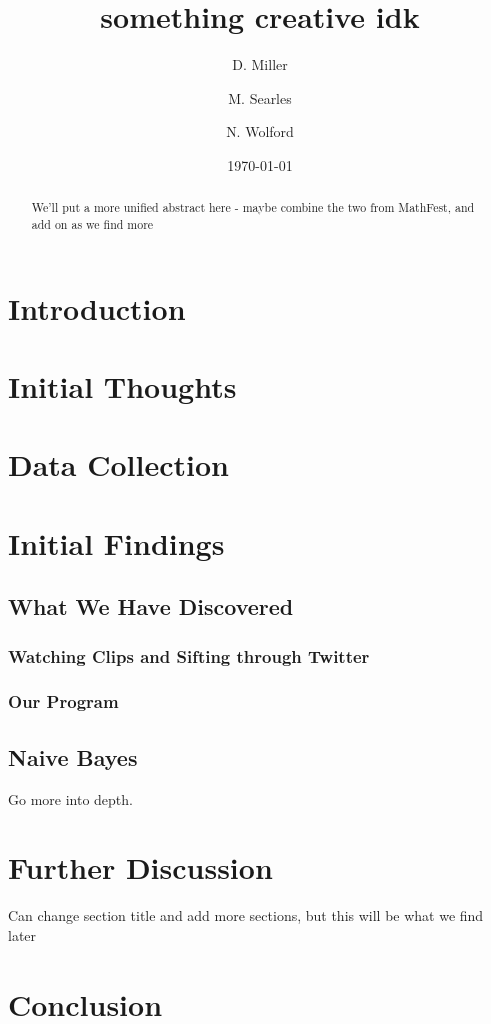 \documentclass[titlepage]{article}
\begin{document}
\title{something creative idk}
\author{D. Miller \and M. Searles \and N. Wolford} %
\date{\today}
\maketitle

\begin{abstract}
We'll put a more unified abstract here - maybe combine the two from MathFest, and add on as we find more
\end{abstract}

\section{Introduction}


\section{Initial Thoughts}


\section{Data Collection}


\section{Initial Findings}

\subsection{What We Have Discovered}

\subsubsection{Watching Clips and Sifting through Twitter}

\subsubsection{Our Program}

\subsection{Naive Bayes}

Go more into depth.


\section{Further Discussion}

Can change section title and add more sections, but this will be what we find later

\section{Conclusion}
\end{document}
